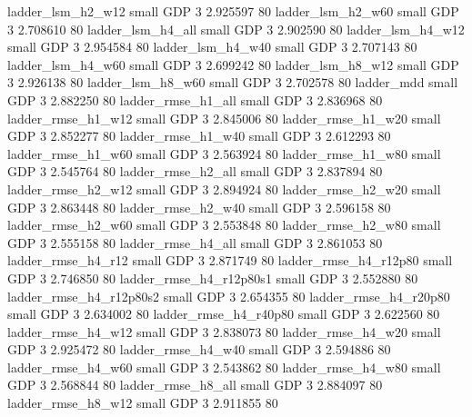        ladder_lsm_h2_w12      small      GDP                 3 2.925597 80
       ladder_lsm_h2_w60      small      GDP                 3 2.708610 80
       ladder_lsm_h4_all      small      GDP                 3 2.902590 80
       ladder_lsm_h4_w12      small      GDP                 3 2.954584 80
       ladder_lsm_h4_w40      small      GDP                 3 2.707143 80
       ladder_lsm_h4_w60      small      GDP                 3 2.699242 80
       ladder_lsm_h8_w12      small      GDP                 3 2.926138 80
       ladder_lsm_h8_w60      small      GDP                 3 2.702578 80
              ladder_mdd      small      GDP                 3 2.882250 80
      ladder_rmse_h1_all      small      GDP                 3 2.836968 80
      ladder_rmse_h1_w12      small      GDP                 3 2.845006 80
      ladder_rmse_h1_w20      small      GDP                 3 2.852277 80
      ladder_rmse_h1_w40      small      GDP                 3 2.612293 80
      ladder_rmse_h1_w60      small      GDP                 3 2.563924 80
      ladder_rmse_h1_w80      small      GDP                 3 2.545764 80
      ladder_rmse_h2_all      small      GDP                 3 2.837894 80
      ladder_rmse_h2_w12      small      GDP                 3 2.894924 80
      ladder_rmse_h2_w20      small      GDP                 3 2.863448 80
      ladder_rmse_h2_w40      small      GDP                 3 2.596158 80
      ladder_rmse_h2_w60      small      GDP                 3 2.553848 80
      ladder_rmse_h2_w80      small      GDP                 3 2.555158 80
      ladder_rmse_h4_all      small      GDP                 3 2.861053 80
      ladder_rmse_h4_r12      small      GDP                 3 2.871749 80
   ladder_rmse_h4_r12p80      small      GDP                 3 2.746850 80
 ladder_rmse_h4_r12p80s1      small      GDP                 3 2.552880 80
 ladder_rmse_h4_r12p80s2      small      GDP                 3 2.654355 80
   ladder_rmse_h4_r20p80      small      GDP                 3 2.634002 80
   ladder_rmse_h4_r40p80      small      GDP                 3 2.622560 80
      ladder_rmse_h4_w12      small      GDP                 3 2.838073 80
      ladder_rmse_h4_w20      small      GDP                 3 2.925472 80
      ladder_rmse_h4_w40      small      GDP                 3 2.594886 80
      ladder_rmse_h4_w60      small      GDP                 3 2.543862 80
      ladder_rmse_h4_w80      small      GDP                 3 2.568844 80
      ladder_rmse_h8_all      small      GDP                 3 2.884097 80
      ladder_rmse_h8_w12      small      GDP                 3 2.911855 80
